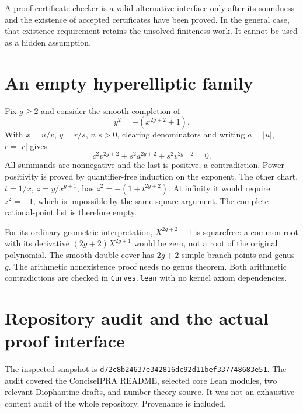 \documentclass[11pt,letterpaper]{article}
\theoremstyle{definition}
\begin{document}
A proof-certificate checker is a valid alternative interface only after
its soundness and the existence of accepted certificates have been
proved. In the general case, that existence requirement retains the
unsolved finiteness work. It cannot be used as a hidden assumption.



\section{An empty hyperelliptic family}
Fix $g\geq2$ and consider the smooth completion of
\[
                       y^2=-(x^{2g+2}+1).               \tag{13}
\]
With $x=u/v$, $y=r/s$, $v,s>0$, clearing denominators and writing
$a=|u|$, $c=|r|$ gives
\[
 c^2v^{2g+2}+s^2a^{2g+2}+s^2v^{2g+2}=0.
\]
All summands are nonnegative and the last is positive, a contradiction.
Power positivity is proved by quantifier-free induction on the exponent.
The other chart, $t=1/x$, $z=y/x^{g+1}$, has
$z^2=-(1+t^{2g+2})$. At infinity it would require $z^2=-1$,
which is impossible by the same square argument.
The complete rational-point list is therefore empty.

For its ordinary geometric interpretation, $X^{2g+2}+1$ is squarefree:
a common root with its derivative $(2g+2)X^{2g+1}$ would be zero,
not a root of the original polynomial. The smooth double cover has
$2g+2$ simple branch points and genus $g$.
The arithmetic nonexistence proof needs no genus theorem.
Both arithmetic contradictions are checked in \texttt{Curves.lean}
with no kernel axiom dependencies.

\section{Repository audit and the actual proof interface}
The inspected snapshot is
\texttt{d72c8b24637e342816dc92d11bef337748683e51}.
The audit covered the ConciseIPRA README, selected core Lean modules,
two relevant Diophantine drafts, and number-theory source. It was not an
exhaustive content audit of the whole repository. Provenance is included.
\end{document}
